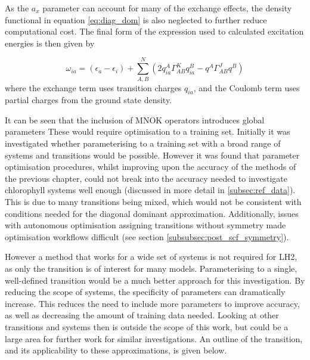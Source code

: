 As the $a_x$ parameter can account for many of the exchange effects, the density 
functional in equation \ref{eq:diag_dom} is also neglected to further reduce computational 
cost. The final form of the expression used to calculated excitation energies is 
then given by

\begin{equation}
\omega_{ia} = \left(\epsilon_a - \epsilon_i\right) + \sum^N_{A,B}\left(2 q_{ia}^A \Gamma^K_{AB} q_{ia}^B - q^A \Gamma^J_{AB} q^B\right)
\end{equation}
%
where the exchange term uses transition charges $q_{ia}$, and the Coulomb term uses
partial charges from the ground state density.

It can be seen that the inclusion of MNOK operators introduces global parameters
These would require optimisation to a training set. Initially it was investigated
whether parameterising to a training set with a broad range of systems and transitions
would be possible. However it was found that parameter optimisation procedures, 
whilst improving upon the accuracy of the \dxtb methods of the previous chapter,
could not break into the accuracy needed to investigate chlorophyll systems well
enough (discussed in more detail in \ref{subsec:ref_data}). This is due to many
transitions being mixed, which would not be consistent with conditions needed for
the diagonal dominant approximation. Additionally, issues with autonomous optimisation
assigning transitions without symmetry made optimisation workflows difficult (see
section \ref{subsubsec:post_scf_symmetry}).

However a method that works for a wide set of systems is not required for LH2,
as only the \Qy transition is of interest for many models. Parameterising to a 
single, well-defined transition would be a much better approach for this investigation.
By reducing the scope of systems, the specificity of parameters can dramatically increase. 
This reduces the need to include more parameters to improve accuracy, as well as 
decreasing the amount of training data needed. Looking at other transitions and
systems then is outside the scope of this work, but could be a large area for further
work for similar investigations. An outline of the \Qy transition, and its applicability
to these approximations, is given below.

